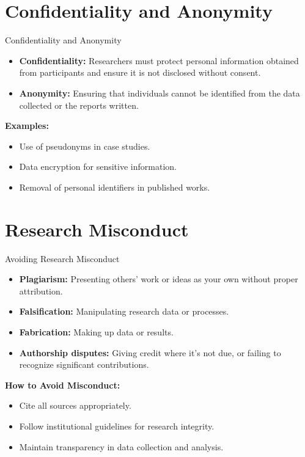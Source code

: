 \documentclass{beamer}
\begin{document}
	\section{Confidentiality and Anonymity}
	\begin{frame}{Confidentiality and Anonymity}
		\begin{itemize}
			\item \textbf{Confidentiality:} Researchers must protect personal information obtained from participants and ensure it is not disclosed without consent.
			\item \textbf{Anonymity:} Ensuring that individuals cannot be identified from the data collected or the reports written.
		\end{itemize}
		\vspace{0.5cm}
		\textbf{Examples:}
		\begin{itemize}
			\item Use of pseudonyms in case studies.
			\item Data encryption for sensitive information.
			\item Removal of personal identifiers in published works.
		\end{itemize}
	\end{frame}
	
	\section{Research Misconduct}
	\begin{frame}{Avoiding Research Misconduct}
		\begin{itemize}
			\item \textbf{Plagiarism:} Presenting others' work or ideas as your own without proper attribution.
			\item \textbf{Falsification:} Manipulating research data or processes.
			\item \textbf{Fabrication:} Making up data or results.
			\item \textbf{Authorship disputes:} Giving credit where it's not due, or failing to recognize significant contributions.
		\end{itemize}
		\vspace{0.5cm}
		\textbf{How to Avoid Misconduct:}
		\begin{itemize}
			\item Cite all sources appropriately.
			\item Follow institutional guidelines for research integrity.
			\item Maintain transparency in data collection and analysis.
		\end{itemize}
	\end{frame}
	
\end{document}

